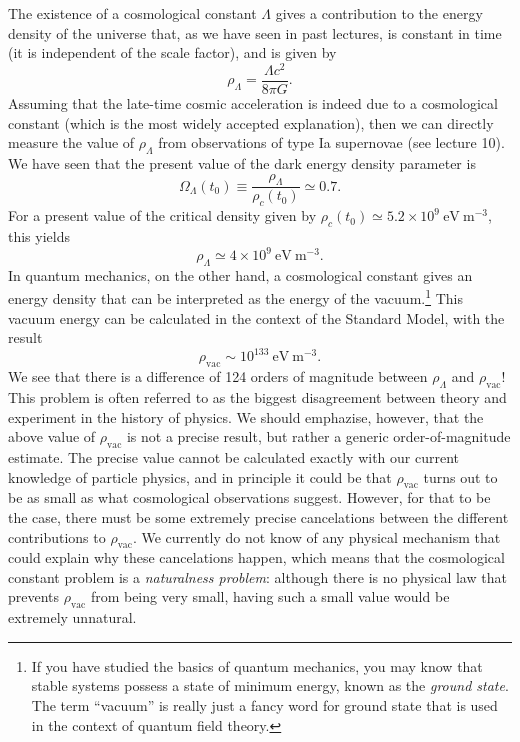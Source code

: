 \documentclass[11pt, a4paper,oneside,openright]{book}
\numberwithin{equation}{section}
\begin{document}
The existence of a cosmological constant $\Lambda$ gives a contribution to the energy density of the universe that, as we have seen in past lectures, is constant in time (it is independent of the scale factor), and is given by
\begin{equation}
\rho_{\Lambda}=\frac{\Lambda c^2}{8\pi G}.
\end{equation}
Assuming that the late-time cosmic acceleration is indeed due to a cosmological constant (which is the most widely accepted explanation), then we can directly measure the value of $\rho_{\Lambda}$ from observations of type Ia supernovae (see lecture 10). We have seen that the present value of the dark energy density parameter is
\begin{equation}
\Omega_{\Lambda}(t_0)\equiv \frac{\rho_{\Lambda}}{\rho_c(t_0)}\simeq 0.7.
\end{equation}
For a present value of the critical density given by $\rho_c(t_0)\simeq 5.2\times10^{9}~\mathrm{eV~m^{-3}}$, this yields
\begin{equation}
\rho_{\Lambda}\simeq 4\times10^{9}~\mathrm{eV~m^{-3}}.
\end{equation}
In quantum mechanics, on the other hand, a cosmological constant gives an energy density that can be interpreted as the energy of the vacuum.\footnote{If you have studied the basics of quantum mechanics, you may know that stable systems possess a state of minimum energy, known as the {\it ground state}. The term ``vacuum'' is really just a fancy word for ground state that is used in the context of quantum field theory.} This vacuum energy can be calculated in the context of the Standard Model, with the result
\begin{equation} \label{eq:rho_vac}
\rho_{\mathrm{vac}}\sim 10^{133}~\mathrm{eV~m^{-3}}.
\end{equation}
We see that there is a difference of 124 orders of magnitude between $\rho_{\Lambda}$ and $\rho_{\mathrm{vac}}$! This problem is often referred to as the biggest disagreement between theory and experiment in the history of physics. We should emphazise, however, that the above value of $\rho_{\mathrm{vac}}$ is not a precise result, but rather a generic order-of-magnitude estimate. The precise value cannot be calculated exactly with our current knowledge of particle physics, and in principle it could be that $\rho_{\mathrm{vac}}$ turns out to be as small as what cosmological observations suggest. However, for that to be the case, there must be some extremely precise cancelations between the different contributions to $\rho_{\mathrm{vac}}$. We currently do not know of any physical mechanism that could explain why these cancelations happen, which means that the cosmological constant problem is a {\it naturalness problem}: although there is no physical law that prevents $\rho_{\mathrm{vac}}$ from being very small, having such a small value would be extremely unnatural.
\end{document}
